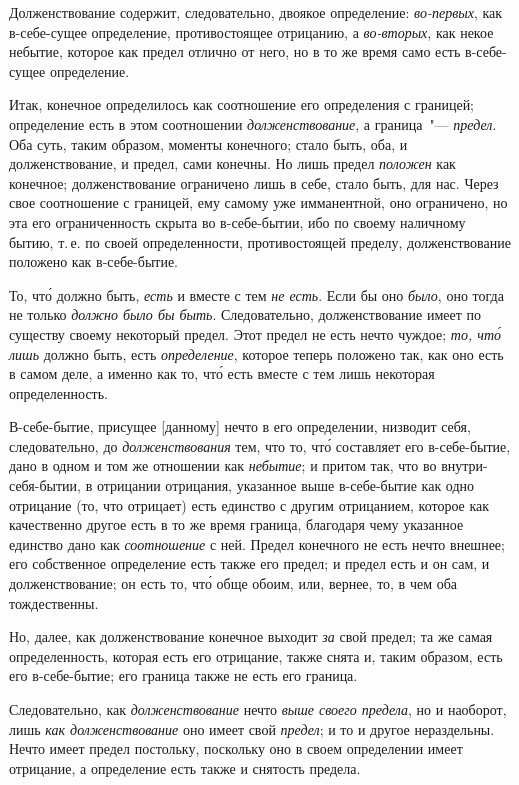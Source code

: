Долженствование содержит, следовательно, двоякое
определение: \emph{во-первых}, как в-себе-сущее определение,
противостоящее отрицанию, а \emph{во-вторых}, как некое небытие,
которое как предел отлично от него, но в то же
время само есть в-себе-сущее определение.

Итак, конечное определилось как соотношение его
определения с границей; определение есть в этом соотношении
\emph{долженствование}, а граница~"--- \emph{предел}. Оба суть,
таким образом, моменты конечного; стало быть, оба, и
долженствование, и предел, сами конечны. Но лишь предел
\emph{положен} как конечное; долженствование ограничено
лишь в себе, стало быть, для нас. Через свое соотношение
с границей, ему самому уже имманентной, оно
ограничено, но эта его ограниченность скрыта во в-себе-бытии,
ибо по своему наличному бытию, т.\,е. по своей
определенности, противостоящей пределу, долженствование
положено как в-себе-бытие.

То, чт\'о должно быть, \emph{есть} и вместе с тем \emph{не есть}.
Если бы оно \emph{было}, оно тогда не только \emph{должно было бы
быть}. Следовательно, долженствование имеет по существу
своему некоторый предел. Этот предел не есть нечто
чуждое; \emph{то, чт\'о лишь} должно быть, есть \emph{определение},
которое теперь положено так, как оно есть в самом деле,
а именно как то, чт\'о есть вместе с тем лишь некоторая
определенность.

В-себе-бытие, присущее [данному] нечто в его определении,
низводит себя, следовательно, до \emph{долженствования}
тем, что то, чт\'о составляет его в-себе-бытие, дано в одном
и том же отношении как \emph{небытие}; и притом так, что во
внутри-себя-бытии, в отрицании отрицания, указанное
выше в-себе-бытие как одно отрицание (то, что отрицает)
есть единство с другим отрицанием, которое как качественно
другое есть в то же время граница, благодаря чему
указанное единство дано как \emph{соотношение} с ней. Предел
конечного не есть нечто внешнее; его собственное определение
есть также его предел; и предел есть и он сам, и
долженствование; он есть то, чт\'о обще обоим, или, вернее,
то, в чем оба тождественны.

Но, далее, как долженствование конечное выходит \emph{за}
свой предел; та же самая определенность, которая есть
его отрицание, также снята и, таким образом, есть его
в-себе-бытие; его граница также не есть его граница.

Следовательно, как \emph{долженствование} нечто \emph{выше своего
предела}, но и наоборот, лишь \emph{как долженствование}
оно имеет свой \emph{предел}; и то и другое нераздельны. Нечто
имеет предел постольку, поскольку оно в своем определении
имеет отрицание, а определение есть также и снятость
предела.


